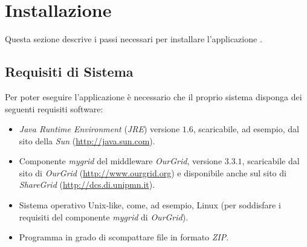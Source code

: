 
\section{Installazione} \label{sec:inst}

Questa sezione descrive i passi necessari per installare l'applicazione \mgTheApp{}.

\subsection{Requisiti di Sistema} \label{ssec:inst-sysreq}

Per poter eseguire l'applicazione \mgTheApp{} \`e necessario che il proprio sistema disponga dei seguenti requisiti software:
\begin{itemize}
\item \emph{Java Runtime Environment} (\emph{JRE}) versione $1.6$, scaricabile, ad esempio, dal sito della \emph{Sun} (\href{http://java.sun.com}{http://java.sun.com}).
\item Componente \emph{mygrid} del middleware \emph{OurGrid}, versione $3.3.1$, scaricabile dal sito di \emph{OurGrid} (\href{http://www.ourgrid.org}{http://www.ourgrid.org}) e disponibile anche sul sito di \emph{ShareGrid} (\href{http://dcs.di.unipmn.it}{http://dcs.di.unipmn.it}).
\item Sistema operativo Unix-like, come, ad esempio, Linux (per soddisfare i requisiti del componente \emph{mygrid} di \emph{OurGrid}).
\item Programma in grado di scompattare file in formato \emph{ZIP}.
\end{itemize}

